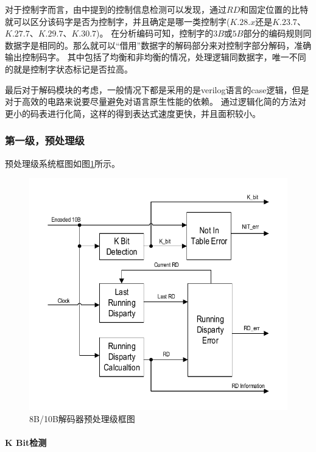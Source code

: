 \documentclass[UTF8]{ctexart}
\begin{document}
对于控制字而言，由\cite{Actel1998}中提到的控制信息检测可以发现，通过$RD$和固定位置的比特就可以区分该码字是否为控制字，并且确定是哪一类控制字($K.28.x$还是$K.23.7$、$K.27.7$、$K.29.7$、$K.30.7$)。
在分析编码可知，控制字的$3B$或$5B$部分的编码规则同数据字是相同的。那么就可以“借用”数据字的解码部分来对控制字部分解码，准确输出控制码字。
其中包括了均衡和非均衡的情况，处理逻辑同数据字，唯一不同的就是控制字状态标记是否拉高。

最后对于解码模块的考虑，一般情况下都是采用的是verilog语言的case逻辑，但是对于高效的电路来说要尽量避免对语言原生性能的依赖。
通过逻辑化简的方法对更小的码表进行化简，这样的得到表达式速度更快，并且面积较小。

\subsubsection{第一级，预处理级}

预处理级系统框图如图\ref{fig:8b10b_preprocess_model}所示。

\begin{figure}[H]
\centering
\includegraphics[width=14cm]{./img/8b10b_preprocess_model.pdf}
\caption{8B/10B解码器预处理级框图}
\label{fig:8b10b_preprocess_model}
\end{figure}

\paragraph{K Bit检测}
\end{document}
